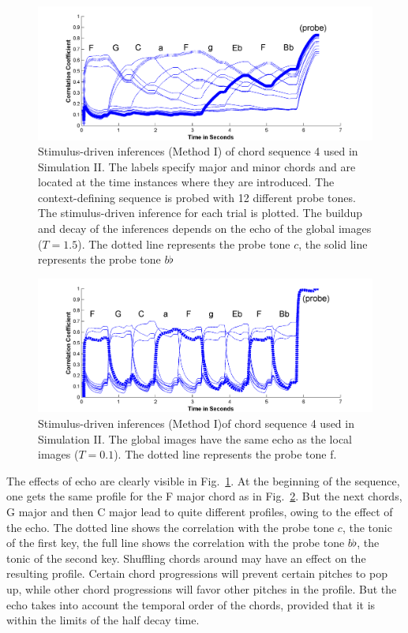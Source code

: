 \begin{figure}[h]
    \centering
    \includegraphics[width=\IPEMDefaultFigureWidth]{Graphics/TonalityDemoFig11}
    \caption {Stimulus-driven inferences (Method I) of chord sequence 4 used in Simulation II. The labels
    specify major and minor chords and are located at the time instances where they are
    introduced.
    The context-defining sequence is probed with 12 different probe tones. The stimulus-driven inference
    for each trial is plotted. The buildup and decay of the inferences depends on the echo of the global images
    ($T=1.5$). The dotted line represents the probe tone $c$, the solid line represents the probe tone $b\flat$}
    \label{Fig:TonalityDemoFig11}
\end{figure}

\begin{figure}[h]
    \centering
    \includegraphics[width=\IPEMDefaultFigureWidth]{Graphics/TonalityDemoFig12}
    \caption{Stimulus-driven inferences (Method I)of chord sequence 4 used in Simulation II.
     The global images have the same echo as the local images ($T=0.1$). The dotted line represents the probe tone f.}
    \label{Fig:TonalityDemoFig12}
\end{figure}

The effects of echo are clearly visible in
Fig.~\ref{Fig:TonalityDemoFig11}. At the beginning of the
sequence, one gets the same profile for the F major chord as in
Fig.~\ref{Fig:TonalityDemoFig12}. But the next chords, G major and
then C major lead to quite different profiles, owing to the effect
of the echo. The dotted line shows the correlation with the probe
tone $c$, the tonic of the first key, the full line shows the
correlation with the probe tone $b\flat$, the tonic of the second
key. Shuffling chords around may have an effect on the resulting
profile. Certain chord progressions will prevent certain pitches
to pop up, while other chord progressions will favor other pitches
in the profile. But the echo takes into account the temporal order
of the chords, provided that it is within the limits of the half
decay time.

